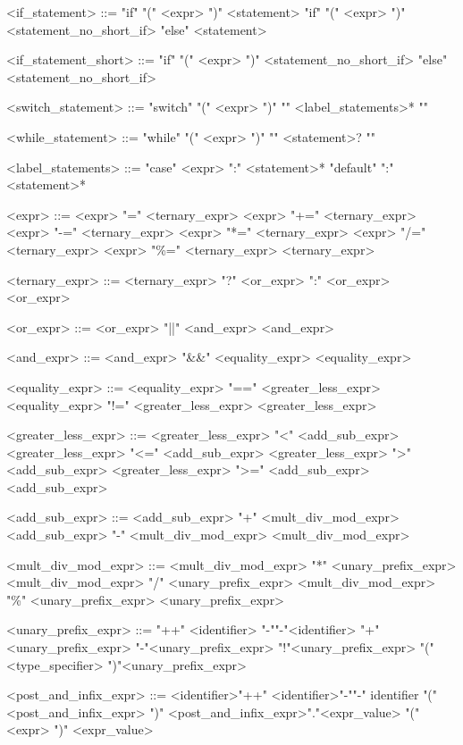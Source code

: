 \begin{grammar}
 <if\_statement> ::= "if" "(" <expr> ")" <statement>
 \alt "if" "(" <expr> ")" <statement\_no\_short\_if> "else" <statement>
 
 <if\_statement\_short> ::= "if" "(" <expr> ")" <statement\_no\_short\_if> "else" <statement\_no\_short\_if>
 
 <switch\_statement> ::= "switch" "(" <expr> ")" "{" <label\_statements>* "}"
 
 <while\_statement> ::= "while" "(" <expr> ")" "{" <statement>? "}"
 
 <label\_statements> ::= "case" <expr> ":" <statement>*
 \alt "default" ":" <statement>*
 
 <expr> ::= <expr> "=" <ternary\_expr>
 \alt <expr> "+=" <ternary\_expr>
 \alt <expr> "-=" <ternary\_expr>
 \alt <expr> "*=" <ternary\_expr>
 \alt <expr> "/=" <ternary\_expr>
 \alt <expr> "\%=" <ternary\_expr>
 \alt <ternary\_expr>
 
 <ternary\_expr> ::= <ternary\_expr> "?" <or\_expr> ":" <or\_expr>
 \alt <or\_expr>
 
 <or\_expr> ::= <or\_expr> "||" <and\_expr>
 \alt <and\_expr>
 
 <and\_expr> ::= <and\_expr> "&&" <equality\_expr>
 \alt <equality\_expr>
 
 <equality\_expr> ::= <equality\_expr> "==" <greater\_less\_expr>
 \alt <equality\_expr> "!=" <greater\_less\_expr>
 \alt <greater\_less\_expr>
 
 <greater\_less\_expr> ::= <greater\_less\_expr> "<" <add\_sub\_expr>
 \alt <greater\_less\_expr> "<=" <add\_sub\_expr>
 \alt <greater\_less\_expr> ">" <add\_sub\_expr>
 \alt <greater\_less\_expr> ">=" <add\_sub\_expr>
 \alt <add\_sub\_expr>
 
 <add\_sub\_expr> ::= <add\_sub\_expr> "+" <mult\_div\_mod\_expr>
 \alt <add\_sub\_expr> "-" <mult\_div\_mod\_expr>
 \alt <mult\_div\_mod\_expr>
 
 <mult\_div\_mod\_expr> ::= <mult\_div\_mod\_expr> "*" <unary\_prefix\_expr>
 \alt <mult\_div\_mod\_expr> "/" <unary\_prefix\_expr>
 \alt <mult\_div\_mod\_expr> "\%" <unary\_prefix\_expr>
 \alt <unary\_prefix\_expr>
 
 <unary\_prefix\_expr> ::= "++" <identifier>
 \alt "-""-"<identifier>
 \alt "+"<unary\_prefix\_expr>
 \alt "-"<unary\_prefix\_expr>
 \alt "!"<unary\_prefix\_expr>
 \alt "(" <type\_specifier> ")"<unary\_prefix\_expr>
 
 <post\_and\_infix\_expr> ::= <identifier>"++"
 \alt <identifier>"-""-"
 \alt identifier "(" <post\_and\_infix\_expr> ")"
 \alt <post\_and\_infix\_expr>"."<expr\_value>
 \alt "(" <expr> ")"
 \alt <expr\_value>
 

\end{grammar}
